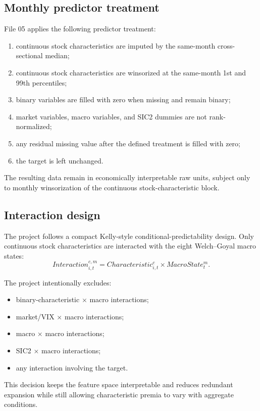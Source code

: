\documentclass[11pt,a4paper]{article}
\begin{document}
\subsection{Monthly predictor treatment}

File 05 applies the following predictor treatment:
\begin{enumerate}
  \item continuous stock characteristics are imputed by the same-month cross-sectional median;
  \item continuous stock characteristics are winsorized at the same-month 1st and 99th percentiles;
  \item binary variables are filled with zero when missing and remain binary;
  \item market variables, macro variables, and SIC2 dummies are not rank-normalized;
  \item any residual missing value after the defined treatment is filled with zero;
  \item the target is left unchanged.
\end{enumerate}

The resulting data remain in economically interpretable raw units, subject only to monthly winsorization of the continuous stock-characteristic block.

\subsection{Interaction design}

The project follows a compact Kelly-style conditional-predictability design. Only continuous stock characteristics are interacted with the eight Welch--Goyal macro states:
\[
  Interaction_{i,t}^{c,m}=Characteristic_{i,t}^{c}\times MacroState_t^{m}.
\]

The project intentionally excludes:
\begin{itemize}
  \item binary-characteristic $\times$ macro interactions;
  \item market/VIX $\times$ macro interactions;
  \item macro $\times$ macro interactions;
  \item SIC2 $\times$ macro interactions;
  \item any interaction involving the target.
\end{itemize}

This decision keeps the feature space interpretable and reduces redundant expansion while still allowing characteristic premia to vary with aggregate conditions.
\end{document}
